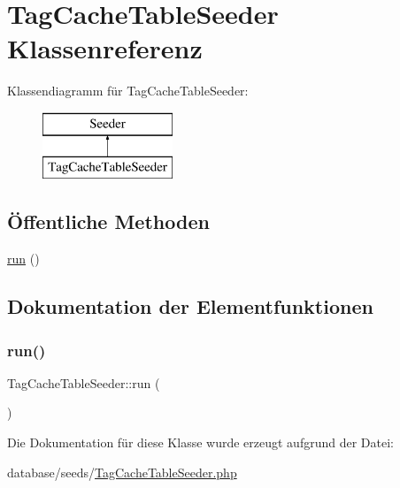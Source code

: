 \hypertarget{classTagCacheTableSeeder}{}\section{Tag\+Cache\+Table\+Seeder Klassenreferenz}
\label{classTagCacheTableSeeder}
Klassendiagramm für Tag\+Cache\+Table\+Seeder\+:\begin{figure}[H]
\begin{center}
\leavevmode
\includegraphics[height=2.000000cm]{d4/dc5/classTagCacheTableSeeder}
\end{center}
\end{figure}
\subsection*{Öffentliche Methoden}
\begin{DoxyCompactItemize}
\item 
\hyperlink{classTagCacheTableSeeder_a80e934351894be73bd78f62f8b2d5d3f}{run} ()
\end{DoxyCompactItemize}


\subsection{Dokumentation der Elementfunktionen}
\mbox{\label{classTagCacheTableSeeder_a80e934351894be73bd78f62f8b2d5d3f}} 
\subsubsection{\texorpdfstring{run()}{run()}}
{\footnotesize\ttfamily Tag\+Cache\+Table\+Seeder\+::run (\begin{DoxyParamCaption}{ }\end{DoxyParamCaption})}



Die Dokumentation für diese Klasse wurde erzeugt aufgrund der Datei\+:\begin{DoxyCompactItemize}
\item 
database/seeds/\hyperlink{TagCacheTableSeeder_8php}{Tag\+Cache\+Table\+Seeder.\+php}\end{DoxyCompactItemize}

